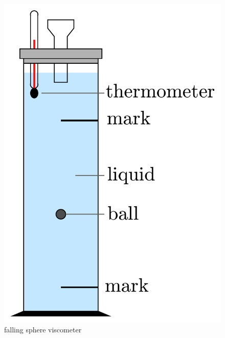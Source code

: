 \begin{figure}
    \begin{minipage}{.3\textwidth}
        \centering
        \vspace{4.mm}
        \includegraphics[scale=.25]{Bilder/kugelfall.pdf}
        \vspace{4.mm}
        \caption{falling sphere viscometer}
        \label{fig:kug}
    \end{minipage}
    \hspace{5mm}
    \begin{minipage}{.3\textwidth}
    \centering

\end{minipage}
\end{figure}
